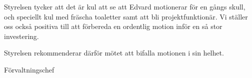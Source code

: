 \documentclass[../_main/handlingar.tex]{subfiles}
\begin{document}
\motionssvar

Styrelsen tycker att det är kul att se att Edvard motionerar för en gångs skull, och speciellt kul med fräscha toaletter samt att bli projektfunktionär. Vi ställer oss också positiva till att förbereda en ordentlig motion inför en så stor investering.  

Styrelsen rekommenderar därför mötet att bifalla motionen i sin helhet.


\begin{signatures}{1}
    \ist
    \signature{\fvc}{Förvaltningschef}
\end{signatures}
\end{document}
